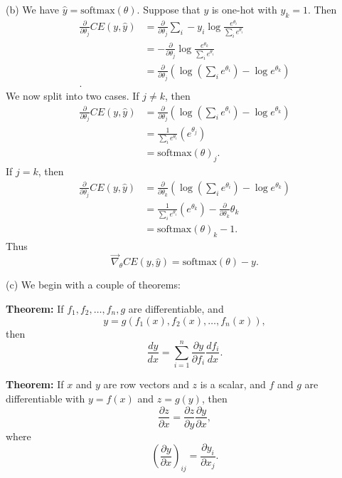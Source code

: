 \documentclass{article}
\begin{document}
(b) We have $\hat{y} = \text{softmax}(\theta).$ Suppose that $y$ is one-hot with $y_k = 1$. Then
\begin{align*}
\frac{\partial}{\partial \theta_j} CE(y, \hat{y}) &= \frac{\partial}{\partial \theta_j} \sum_i -y_i \log \frac{e^{\theta_i}}{\sum_i e^{\theta_i}}\\
&= -\frac{\partial}{\partial \theta_j} \log\frac{e^{\theta_k}}{\sum_i e^{\theta_i}}\\
&= \frac{\partial}{\partial \theta_j} \left(\log\left(\sum_i e^{\theta_i}\right) - \log e^{\theta_k} \right)\\.
\end{align*}
We now split into two cases. If $j \ne k$, then
\begin{align*}
\frac{\partial}{\partial \theta_j} CE(y, \hat{y}) &= \frac{\partial}{\partial \theta_j} \left(\log\left(\sum_i e^{\theta_i}\right) - \log e^{\theta_k} \right)\\
&= \frac{1}{\sum_i e^{\theta_i}}(e^{\theta_j})\\
&= \text{softmax}(\theta)_j.
\end{align*}
If $j = k$, then
\begin{align*}
\frac{\partial}{\partial \theta_j} CE(y, \hat{y}) &= \frac{\partial}{\partial \theta_k} \left(\log\left(\sum_i e^{\theta_i}\right) - \log e^{\theta_k} \right)\\
&= \frac{1}{\sum_i e^{\theta_i}}(e^{\theta_k}) - \frac{\partial}{\partial \theta_k}\theta_k\\
&= \text{softmax}(\theta)_k - 1.
\end{align*}
Thus
$$\vec{\nabla}_{\theta} CE(y, \hat{y}) = \text{softmax}(\theta) - y.$$

(c) We begin with a couple of theorems:

\textbf{Theorem:} If $f_1, f_2, \dots, f_n, g$ are differentiable, and
$$y = g(f_1(x), f_2(x), \dots, f_n(x)),$$
then
$$\frac{dy}{dx} = \sum_{i=1}^n \frac{\partial y}{\partial f_i} \frac{df_i}{dx}.$$

\textbf{Theorem:} If $x$ and $y$ are row vectors and $z$ is a scalar, and $f$ and $g$ are differentiable with $y = f(x)$ and $z = g(y)$, then
$$\frac{\partial z}{\partial x} = \frac{\partial z}{\partial y}\frac{\partial y}{\partial x},$$
where
$$\left(\frac{\partial y}{\partial x}\right)_{ij} = \frac{\partial y_i}{\partial x_j}.$$
\end{document}

